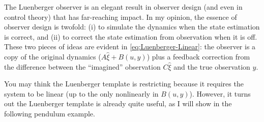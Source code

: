 \documentclass[
]{book}
\theoremstyle{definition}
\theoremstyle{definition}
\theoremstyle{definition}
\theoremstyle{definition}
\theoremstyle{remark}
\begin{document}
The Luenberger observer is an elegant result in observer design (and even in control theory) that has far-reaching impact. In my opinion, the essence of observer design is twofold: (i) to simulate the dynamics when the state estimation is correct, and (ii) to correct the state estimation from observation when it is off. These two pieces of ideas are evident in \eqref{eq:Luenberger-Linear}: the observer is a copy of the original dynamics (\(A \hat{\xi} + B(u,y)\)) plus a feedback correction from the difference between the ``imagined'' observation \(C\hat{\xi}\) and the true observation \(y\).

You may think the Luenberger template is restricting because it requires the system to be linear (up to the only nonlinearly in \(B(u,y)\)). However, it turns out the Luenberger template is already quite useful, as I will show in the following pendulum example.
\end{document}
